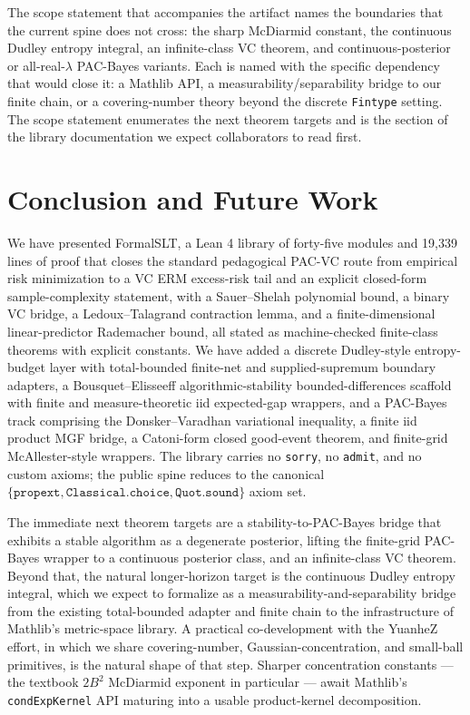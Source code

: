 \documentclass[sigplan,anonymous,review,screen]{acmart}
\begin{document}
The scope statement that accompanies the artifact names the boundaries that
the current spine does not cross: the sharp McDiarmid constant, the
continuous Dudley entropy integral, an infinite-class VC theorem, and
continuous-posterior or all-real-$\lambda$ PAC-Bayes variants. Each is named
with the specific dependency that would close it: a Mathlib API, a
measurability/separability bridge to our finite chain, or a covering-number
theory beyond the discrete \texttt{Fintype} setting. The scope statement
enumerates the next theorem targets and is the section of the library
documentation we expect collaborators to read first.

\section{Conclusion and Future Work}
\label{sec:conclusion}

We have presented FormalSLT, a Lean 4 library of forty-five modules and
19,339 lines of proof that closes the standard
pedagogical PAC-VC route from empirical risk minimization to a VC ERM
excess-risk tail and an explicit closed-form sample-complexity statement,
with a Sauer--Shelah polynomial bound, a binary VC bridge, a
Ledoux--Talagrand contraction lemma, and a finite-dimensional
linear-predictor Rademacher bound, all stated as machine-checked
finite-class theorems with explicit constants. We have added a
discrete Dudley-style entropy-budget layer with total-bounded finite-net and
supplied-supremum boundary adapters, a Bousquet--Elisseeff
algorithmic-stability bounded-differences scaffold with finite and
measure-theoretic iid expected-gap wrappers, and a PAC-Bayes track comprising
the Donsker--Varadhan variational inequality, a finite iid product MGF bridge,
a Catoni-form closed good-event theorem, and finite-grid McAllester-style
wrappers. The library carries no
\texttt{sorry}, no \texttt{admit}, and no custom axioms; the public
spine reduces to the canonical $\{\texttt{propext},
\texttt{Classical.choice}, \texttt{Quot.sound}\}$ axiom set.

The immediate next theorem targets are a stability-to-PAC-Bayes bridge that
exhibits a stable algorithm as a degenerate posterior, lifting the finite-grid
PAC-Bayes wrapper to a continuous posterior class, and an infinite-class VC
theorem. Beyond that, the natural longer-horizon target is the continuous
Dudley entropy integral, which we expect to formalize as a
measurability-and-separability bridge from the existing total-bounded adapter
and finite chain to the infrastructure of Mathlib's metric-space library.
A practical co-development with the YuanheZ effort, in which we share
covering-number, Gaussian-concentration, and small-ball primitives, is
the natural shape of that step. Sharper concentration constants ---
the textbook $2B^{2}$ McDiarmid exponent in particular --- await
Mathlib's \texttt{condExpKernel} API maturing into a usable
product-kernel decomposition.
\end{document}
